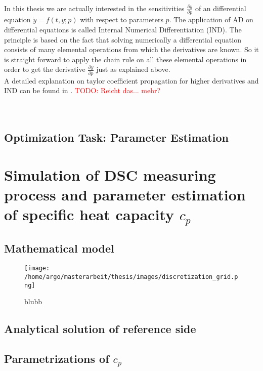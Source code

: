 \documentclass{scrartcl}[12pt, halfparskip]
\newcommand{\todo}[1]{\textcolor{red}{TODO: #1}}
\begin{document}
In this thesis we are actually interested in the sensitivities $\frac{\partial y}{\partial p}$ of an differential equation $\dot{y}=f(t,y;p)$ with respect to parameters $p$. The application of AD on differential equations is called Internal Numerical Differentiation (IND). The principle is based on the fact that solving numerically a differential equation consists of many elemental operations from which the derivatives are known. So it is straight forward to apply the chain rule on all these elemental operations in order to get the derivative $\frac{\partial y}{\partial p}$ just as explained above. \\
A detailed explanation on taylor coefficient propagation for higher derivatives and IND can be found in \cite{diss_jan}. \todo{Reicht das... mehr?}


\paragraph{}\mbox{}\\



\subsection{Optimization Task: Parameter Estimation}


\newpage
\section{Simulation of DSC measuring process and parameter estimation of specific heat capacity $c_p$}
\subsection{Mathematical model}

\begin{figure}[H]
	\centering
	\texttt{[image: /home/argo/masterarbeit/thesis/images/discretization\_grid.png]}
	\caption{blubb}
\end{figure}



\subsection{Analytical solution of reference side}
\subsection{Parametrizations of $c_p$}
\end{document}
